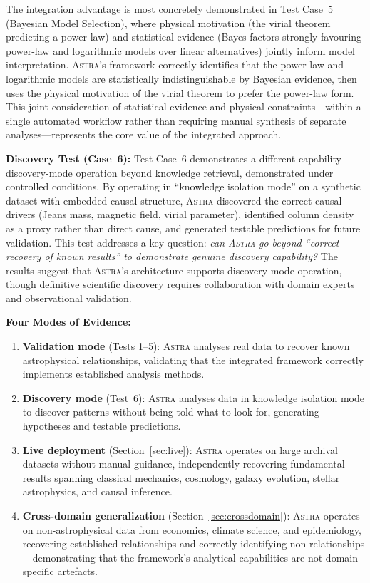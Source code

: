 \documentclass[usenatbib]{rasti}
\newcommand{\astra}{\textsc{Astra}\xspace}
\begin{document}
The integration advantage is most concretely demonstrated in Test Case~5 (Bayesian Model Selection), where physical motivation (the virial theorem predicting a power law) and statistical evidence (Bayes factors strongly favouring power-law and logarithmic models over linear alternatives) jointly inform model interpretation.
\astra's framework correctly identifies that the power-law and logarithmic models are statistically indistinguishable by Bayesian evidence, then uses the physical motivation of the virial theorem to prefer the power-law form.
This joint consideration of statistical evidence and physical constraints---within a single automated workflow rather than requiring manual synthesis of separate analyses---represents the core value of the integrated approach.

\textbf{Discovery Test (Case~6):}
Test Case~6 demonstrates a different capability---discovery-mode operation beyond knowledge retrieval, demonstrated under controlled conditions.
By operating in ``knowledge isolation mode'' on a synthetic dataset with embedded causal structure, \astra discovered the correct causal drivers (Jeans mass, magnetic field, virial parameter), identified column density as a proxy rather than direct cause, and generated testable predictions for future validation.
This test addresses a key question: \emph{can \astra go beyond ``correct recovery of known results'' to demonstrate genuine discovery capability?}
The results suggest that \astra's architecture supports discovery-mode operation, though definitive scientific discovery requires collaboration with domain experts and observational validation.

\textbf{Four Modes of Evidence:}
\begin{enumerate}
  \item[(i)] \textbf{Validation mode} (Tests 1--5): \astra analyses real data to recover known astrophysical relationships, validating that the integrated framework correctly implements established analysis methods.
  \item[(ii)] \textbf{Discovery mode} (Test~6): \astra analyses data in knowledge isolation mode to discover patterns without being told what to look for, generating hypotheses and testable predictions.
  \item[(iii)] \textbf{Live deployment} (Section~\ref{sec:live}): \astra operates on large archival datasets without manual guidance, independently recovering fundamental results spanning classical mechanics, cosmology, galaxy evolution, stellar astrophysics, and causal inference.
  \item[(iv)] \textbf{Cross-domain generalization} (Section~\ref{sec:crossdomain}): \astra operates on non-astrophysical data from economics, climate science, and epidemiology, recovering established relationships and correctly identifying non-relationships---demonstrating that the framework's analytical capabilities are not domain-specific artefacts.
\end{enumerate}
\end{document}
